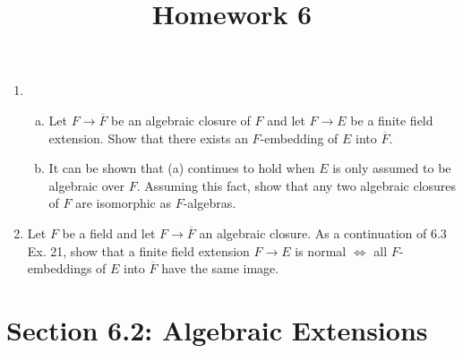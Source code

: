 \documentclass{article}
\begin{document}
\title{Homework 6}
\maketitle
\thispagestyle{fancy}

\begin{enumerate}
	\item
		\begin{enumerate}[(a)]
			\item Let $F\to \overline{F}$ be an algebraic closure of $F$ and let $F\to E$ be a finite field extension. Show that there exists an $F$-embedding of $E$ into $\overline{F}.$ 

			\item It can be shown that (a) continues to hold when $E$ is only assumed to be algebraic over $F.$ Assuming this fact, show that any two algebraic closures of $F$ are isomorphic as $F$-algebras.
				
		\end{enumerate}

	\item Let $F$ be a field and let $F\to \overline{F}$ an algebraic closure. As a continuation of 6.3 Ex. 21, show that a finite field extension $F\to E$ is normal $\iff$ all $F$-embeddings of $E$ into $\overline{F}$ have the same image.
		
\end{enumerate}

\section*{Section 6.2: Algebraic Extensions}
\end{document}
